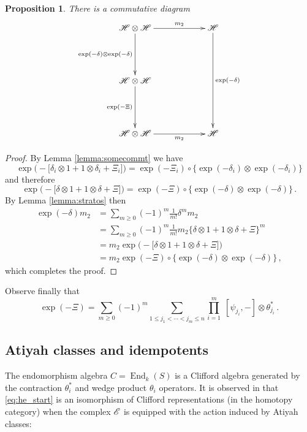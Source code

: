 \documentclass[english,letter paper,12pt,leqno]{article}
\newtheorem{proposition}[theorem]{Proposition}
\theoremstyle{example}
\numberwithin{equation}{section}
\def\be{\begin{equation}}
\def\ee{\end{equation}}
\DeclareMathOperator{\End}{End}
\begin{document}
\begin{proposition}\label{prop:adamant} There is a commutative diagram
\be
\xymatrix@C+3pc@R+2pc{
\mathscr{H} \otimes \mathscr{H} \ar[d]_-{\exp(-\delta) \otimes \exp(-\delta)} \ar[r]^-{m_2} & \mathscr{H} \ar[dd]^-{\exp(-\delta)}\\
\mathscr{H} \otimes \mathscr{H} \ar[d]_-{\exp(-\Xi)}\\
\mathscr{H} \otimes \mathscr{H} \ar[r]_-{m_2} & \mathscr{H}
}
\ee
\end{proposition}
\begin{proof}
By Lemma \ref{lemma:somecommt} we have
\[
\exp\big(-\big[ \delta_i \otimes 1 + 1 \otimes \delta_i + \Xi_i \big]\big) = \exp(-\Xi_i) \circ \big\{ \exp(-\delta_i) \otimes \exp(-\delta_i) \big\}
\]
and therefore
\[
\exp\big(-\big[ \delta \otimes 1 + 1 \otimes \delta + \Xi \big]\big) = \exp(-\Xi) \circ \big\{ \exp(-\delta) \otimes \exp(-\delta) \big\}\,.
\]
By Lemma \ref{lemma:stratos} then
\begin{align*}
\exp(-\delta) m_2 &= \sum_{m \ge 0} (-1)^m \frac{1}{m!} \delta^m m_2\\
&= \sum_{m \ge 0} (-1)^m \frac{1}{m!} m_2 \big\{ \delta \otimes 1 + 1 \otimes \delta + \Xi \big\}^m\\
&= m_2 \exp\big(-\big[ \delta \otimes 1 + 1 \otimes \delta + \Xi \big] \big)\\
&= m_2 \exp(-\Xi) \circ \big\{ \exp(-\delta) \otimes \exp(-\delta) \big\}\,,
\end{align*}
which completes the proof.
\end{proof}

Observe finally that
\be
\exp(-\Xi) = \sum_{m \ge 0} (-1)^m \sum_{1 \le j_1 < \cdots < j_m \le n} \prod_{i=1}^m \;[\psi_{j_i},-] \otimes \theta_{j_i}^*\,.
\ee

\subsection{Atiyah classes and idempotents}

The endomorphism algebra $C = \End_k(S)$ is a Clifford algebra generated by the contraction $\theta_i^*$ and wedge product $\theta_i$ operators. It is observed in \cite{murfet} that \eqref{eq:he_start} is an isomorphism of Clifford representations (in the homotopy category) when the complex $\mathscr{E}$ is equipped with the action induced by Atiyah classes:
\end{document}
